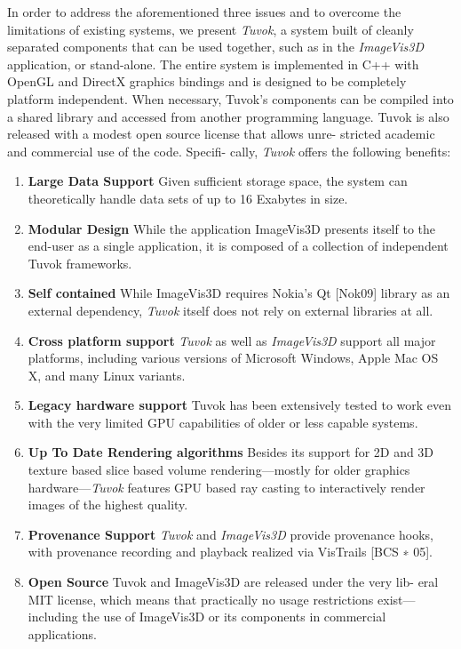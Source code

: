 In order to address the aforementioned three issues and to overcome the
limitations of existing systems, we present \textit{Tuvok}, a system
built of cleanly separated components that can
be used together, such as in the \textit{ImageVis3D} application,
or stand-alone. The entire system is implemented in C++ with OpenGL
and DirectX graphics bindings and is designed to be completely
platform independent. When necessary, Tuvok's components can be
compiled into a shared library and accessed from another programming
language. Tuvok is also released with a modest open source license that
allows unre- stricted academic and commercial use of the code. Specifi-
cally, \textit{Tuvok} offers the following benefits:

\begin{enumerate}

\item \textbf{Large Data Support}
Given sufficient storage space, the system can theoretically
handle data sets of up to 16 Exabytes in size.
\item \textbf{Modular Design}
While the application ImageVis3D presents itself to the
end-user as a single application, it is composed of a
collection of independent Tuvok frameworks.
\item \textbf{Self contained}
While ImageVis3D requires Nokia's Qt [Nok09] library
as an external dependency, \textit{Tuvok} itself does not rely on
external libraries at all.
\item \textbf{Cross platform support}
\textit{Tuvok} as well as \textit{ImageVis3D} support all major platforms,
including various versions of Microsoft Windows, Apple
Mac OS X, and many Linux variants.
\item \textbf{Legacy hardware support}
Tuvok has been extensively tested to work even with the
very limited GPU capabilities of older or less capable
systems.
\item \textbf{Up To Date Rendering algorithms}
Besides its support for 2D and 3D texture based slice
based volume rendering---mostly for older graphics
hardware---\textit{Tuvok} features GPU based ray casting to
interactively render images of the highest quality.
\item \textbf{Provenance Support}
\textit{Tuvok} and \textit{ImageVis3D} provide provenance hooks, with
provenance recording and playback realized via VisTrails
[BCS ∗ 05].
\item \textbf{Open Source}
Tuvok and ImageVis3D are released under the very lib-
eral MIT license, which means that practically no usage
restrictions exist---including the use of ImageVis3D or its
components in commercial applications.

\end{enumerate}


